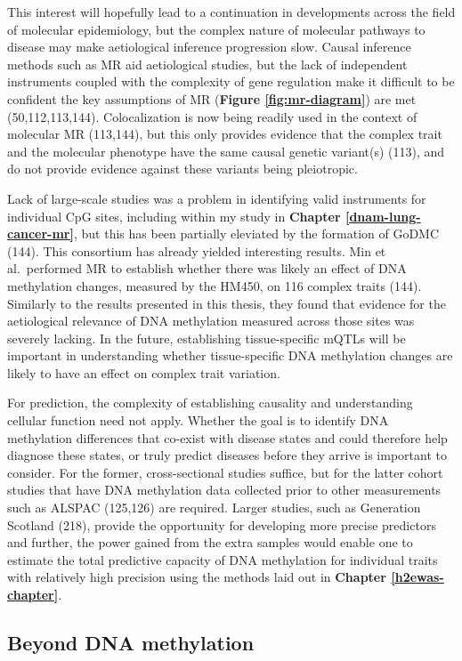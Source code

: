 \documentclass[11pt,oneside]{bristolthesis}
\begin{document}
This interest will hopefully lead to a continuation in developments across the field of molecular epidemiology, but the complex nature of molecular pathways to disease may make aetiological inference progression slow. Causal inference methods such as MR aid aetiological studies, but the lack of independent instruments coupled with the complexity of gene regulation make it difficult to be confident the key assumptions of MR (\textbf{Figure \ref{fig:mr-diagram}}) are met (50,112,113,144). Colocalization is now being readily used in the context of molecular MR (113,144), but this only provides evidence that the complex trait and the molecular phenotype have the same causal genetic variant(s) (113), and do not provide evidence against these variants being pleiotropic.

Lack of large-scale studies was a problem in identifying valid instruments for individual CpG sites, including within my study in \textbf{Chapter \ref{dnam-lung-cancer-mr}}, but this has been partially eleviated by the formation of GoDMC (144). This consortium has already yielded interesting results. Min et al.~performed MR to establish whether there was likely an effect of DNA methylation changes, measured by the HM450, on 116 complex traits (144). Similarly to the results presented in this thesis, they found that evidence for the aetiological relevance of DNA methylation measured across those sites was severely lacking. In the future, establishing tissue-specific mQTLs will be important in understanding whether tissue-specific DNA methylation changes are likely to have an effect on complex trait variation.

For prediction, the complexity of establishing causality and understanding cellular function need not apply. Whether the goal is to identify DNA methylation differences that co-exist with disease states and could therefore help diagnose these states, or truly predict diseases before they arrive is important to consider. For the former, cross-sectional studies suffice, but for the latter cohort studies that have DNA methylation data collected prior to other measurements such as ALSPAC (125,126) are required. Larger studies, such as Generation Scotland (218), provide the opportunity for developing more precise predictors and further, the power gained from the extra samples would enable one to estimate the total predictive capacity of DNA methylation for individual traits with relatively high precision using the methods laid out in \textbf{Chapter \ref{h2ewas-chapter}}.

\hypertarget{beyond-dnam}{%
\subsection{Beyond DNA methylation}\label{beyond-dnam}}
\end{document}
